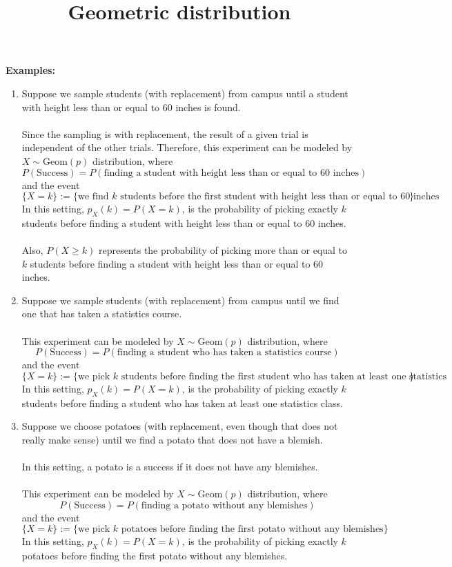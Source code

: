 \documentclass{article}
\title{Geometric distribution}
\begin{document}
\maketitle

\textbf{Examples:}
\begin{enumerate}
    \item Suppose we sample students (with replacement) from campus until a student with height less than or equal to 60 inches is found. \\\\
    Since the sampling is with replacement, the result of a given trial is independent of the other trials. Therefore, this experiment can be modeled by \( X \sim \text{Geom}(p) \) distribution, where
    \[
    P(\text{Success}) = P(\text{finding a student with height less than or equal to 60 inches})
    \]
    and the event
    \[
    \{ X = k \} := \{\text{we find $k$ students before the first student with height less than or equal to 60 inches}\}
    \]
    In this setting, \( p_X(k) = P(X = k) \), is the probability of picking exactly \( k \) students before finding a student with height less than or equal to 60 inches. \\\\
    Also, \( P(X \ge k) \) represents the probability of picking more than or equal to \( k \) students before finding a student with height less than or equal to 60 inches.

    \item Suppose we sample students (with replacement) from campus until we find one that has taken a statistics course. \\\\
    This experiment can be modeled by \( X \sim \text{Geom}(p) \) distribution, where
    \[
    P(\text{Success}) = P(\text{finding a student who has taken a statistics course})
    \]
    and the event
    \[
    \{ X = k \} := \{\text{we pick $k$ students before finding the first student who has taken at least one statistics class}\}
    \]
    In this setting, \( p_X(k) = P(X = k) \), is the probability of picking exactly \( k \) students before finding a student who has taken at least one statistics class.

    \item Suppose we choose potatoes (with replacement, even though that does not really make sense) until we find a potato that does not have a blemish. \\\\
    In this setting, a potato is a success if it does not have any blemishes. \\\\
    This experiment can be modeled by \( X \sim \text{Geom}(p) \) distribution, where
    \[
    P(\text{Success}) = P(\text{finding a potato without any blemishes})
    \]
    and the event
    \[
    \{ X = k \} := \{\text{we pick $k$ potatoes before finding the first potato without any blemishes}\}
    \]
    In this setting, \( p_X(k) = P(X = k) \), is the probability of picking exactly \( k \) potatoes before finding the first potato without any blemishes.
\end{enumerate}
\end{document}
